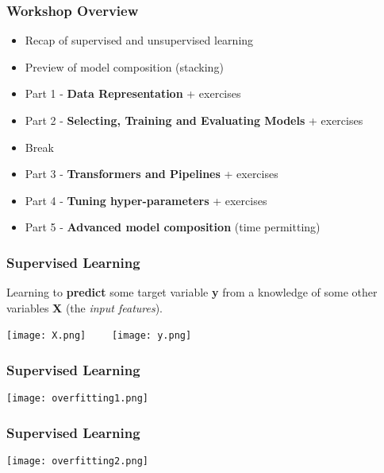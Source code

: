\documentclass[t]{beamer}
\newcommand\df{\bf\color{Maroon}}
\begin{document}
\begin{frame}
  \frametitle{Workshop Overview}
  \begin{itemize}

  \item Recap of supervised and unsupervised learning

  \item Preview of model composition (stacking)

  \item Part 1 - {\df Data Representation} + exercises

  \item Part 2 - {\df Selecting, Training and Evaluating Models} + exercises

  \item  Break

  \item Part 3 - {\df Transformers and Pipelines} + exercises

  \item Part 4 - {\df Tuning hyper-parameters} + exercises

  \item Part 5 - {\df Advanced model composition} (time permitting)

  \end{itemize}
\end{frame}

\begin{frame}
  \frametitle{Supervised Learning}
  Learning to {\df predict} some target variable {\df\large y} from a
  knowledge of some other variables {\df \large X} (the {\it input features}).\pause
  \begin{center}
    \texttt{[image: X.png]}\mbox{~~~~}
    \texttt{[image: y.png]}
  \end{center}
\end{frame}

\begin{frame}
  \frametitle{Supervised Learning}
   \begin{center}
    \texttt{[image: overfitting1.png]}
   \end{center}
\end{frame}

\begin{frame}
  \frametitle{Supervised Learning}
   \begin{center}
    \texttt{[image: overfitting2.png]}
   \end{center}
\end{frame}
\end{document}
